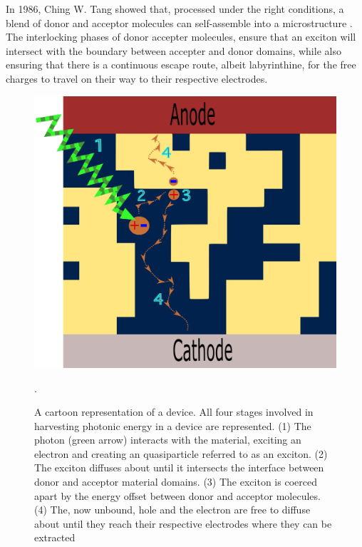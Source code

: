 In 1986, Ching W. Tang
showed that, processed under the right conditions, a blend of donor and acceptor molecules can self-assemble
into a  microstructure \cite{Tang1986c}. 
The interlocking phases of donor accepter molecules, ensure
that an exciton will intersect with the boundary between accepter and donor domains, while also ensuring that
there
is a continuous escape route, albeit labyrinthine, for the free charges to travel on their way to their respective
electrodes. 

\begin{figure}
    \center
    \includegraphics[width = .6\textwidth]{figures/BHJ-figure.png}
    \caption{A cartoon representation of a  device. All four stages involved in harvesting
    photonic energy in a  device are represented. (1) The photon (green arrow) interacts with the material,
    exciting an electron and creating an quasiparticle referred to as an exciton. (2) The exciton diffuses
    about until it intersects the interface between donor and acceptor material domains. (3) The exciton is
    coerced apart by the energy offset between donor and acceptor molecules. 
    (4) The, now unbound,  hole and the electron are free to diffuse about until they reach their respective
    electrodes where they can be extracted \cite{Fusella2019}}.
    \label{bhj}
\end{figure}


